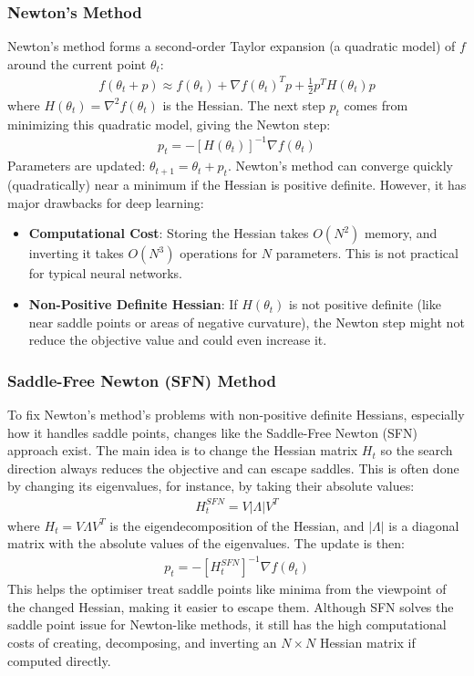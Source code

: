 \subsubsection{Newton's Method}
Newton's method forms a second-order Taylor expansion (a quadratic model) of $f$ around the current point $\theta_t$:
\begin{align}
    f(\theta_t + p) \approx f(\theta_t) + \nabla f(\theta_t)^T p + \frac{1}{2} p^T H(\theta_t) p
\end{align}
where $H(\theta_t) = \nabla^2 f(\theta_t)$ is the Hessian. The next step $p_t$ comes from minimizing this quadratic model, giving the Newton step:
\begin{align}
    p_t = -[H(\theta_t)]^{-1} \nabla f(\theta_t)
    \label{eq:newton_step}
\end{align}
Parameters are updated: $\theta_{t+1} = \theta_t + p_t$. Newton's method can converge quickly (quadratically) near a minimum if the Hessian is positive definite. However, it has major drawbacks for deep learning:
\begin{itemize}
    \item \textbf{Computational Cost}: Storing the Hessian takes $O(N^2)$ memory, and inverting it takes $O(N^3)$ operations for $N$ parameters. This is not practical for typical neural networks.
    \item \textbf{Non-Positive Definite Hessian}: If $H(\theta_t)$ is not positive definite (like near saddle points or areas of negative curvature), the Newton step might not reduce the objective value and could even increase it.
\end{itemize}

\subsubsection{Saddle-Free Newton (SFN) Method}
To fix Newton's method's problems with non-positive definite Hessians, especially how it handles saddle points, changes like the Saddle-Free Newton (SFN) approach exist. The main idea is to change the Hessian matrix $H_t$ so the search direction always reduces the objective and can escape saddles. This is often done by changing its eigenvalues, for instance, by taking their absolute values:
\begin{align}
    H_t^{SFN} = V |\Lambda| V^T
    \label{eq:sfn_hessian}
\end{align}
where $H_t = V \Lambda V^T$ is the eigendecomposition of the Hessian, and $|\Lambda|$ is a diagonal matrix with the absolute values of the eigenvalues. The update is then:
\begin{align}
    p_t = -[H_t^{SFN}]^{-1} \nabla f(\theta_t)
    \label{eq:sfn_step}
\end{align}
This helps the optimiser treat saddle points like minima from the viewpoint of the changed Hessian, making it easier to escape them. Although SFN solves the saddle point issue for Newton-like methods, it still has the high computational costs of creating, decomposing, and inverting an $N \times N$ Hessian matrix if computed directly.

